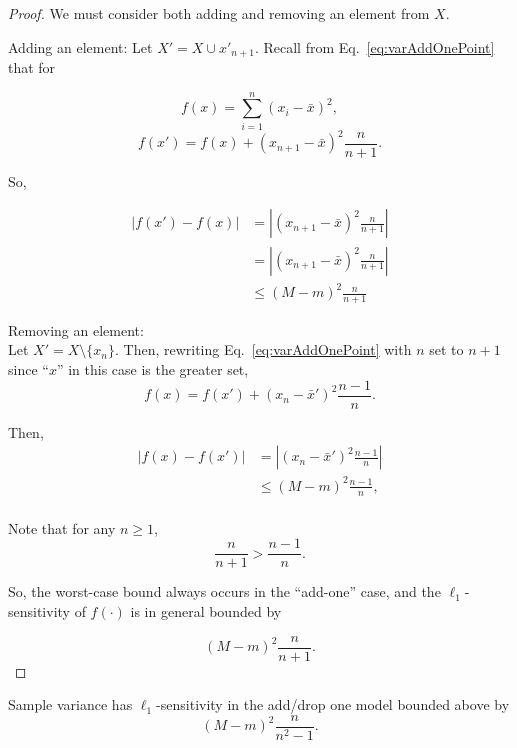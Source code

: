 \documentclass[11pt]{scrartcl} %
\begin{document}
 \begin{proof}
 	We must consider both adding and removing an element from $X$. \newline

 	Adding an element: \newline
 	Let $X' = X \cup x'_{n+1}$. Recall from Eq.~\ref{eq:varAddOnePoint} that for

	$$ f(x) = \sum_{i=1}^n (x_i - \bar{x})^2, $$
	$$ f(x') = f(x) + (x_{n+1} - \bar{x})^2 \frac{n}{n+1}.$$

	So,

	\begin{align}
	\label{eq:L1add}
	\left\vert f(x') - f(x) \right\vert &= \left\vert (x_{n+1} - \bar{x})^2 \frac{n}{n+1} \right\vert \nonumber\\
		&= \left\vert (x_{n+1} - \bar{x})^2 \frac{n}{n+1} \right\vert \nonumber \\
		&\le \left( M-m \right)^2 \frac{n}{n+1} 
	\end{align}

	Removing an element: \\
	Let $X' = X \setminus \{x_n\}$. Then, rewriting Eq.~\ref{eq:varAddOnePoint} with $n$ set to $n+1$ since ``$x$'' in this case is the greater set,
	$$ f(x) = f(x') + (x_n - \bar{x}')^2 \frac{n-1}{n}.$$

	Then,
	\begin{align}
	\label{eq:L1sub}
	\left\vert f(x) - f(x') \right\vert &= \left\vert (x_n - \bar{x}')^2 \frac{n-1}{n} \right\vert \nonumber\\
		&\le (M-m)^2 \frac{n-1}{n},\\
	\end{align}

	Note that for any $n \ge 1$,
	\begin{equation}
	\label{ineq}
	 \frac{n}{n + 1} > \frac{n-1}{n}.
	\end{equation}

	So, the worst-case bound always occurs in the ``add-one'' case, and the $\ell_1$-sensitivity of $f(\cdot)$ is in general bounded by

\begin{equation}
\label{eq:fBoundaddsub}
\left( M-m \right)^2 \frac{n}{n + 1}.
\end{equation}

 \end{proof}

 \begin{corollary}
 \label{cor:l1addsub}
	Sample variance has $\ell_1$-sensitivity in the add/drop one model bounded above by
	$$\left( M-m \right)^2 \frac{n}{n^2 - 1}. $$
 \end{corollary}
 
\end{document}
